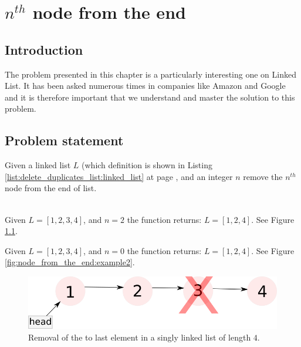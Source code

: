 %

\chapter{$n^{th}$ node from the end}
\label{ch:node_from_the_end}
\section*{Introduction}
The problem presented in this chapter is a particularly interesting one on Linked List. It has been asked numerous times in companies like Amazon and Google and it is therefore important that we understand and master the solution to this problem.

\section{Problem statement}
\begin{exercise}
Given a linked list $L$ (which definition is shown in Listing \ref{list:delete_duplicates_list:linked_list} at page \pageref{list:delete_duplicates_list:linked_list} , and an integer $n$ remove the $n^{th}$ node from the end of list.

\begin{example}
	\hfill \\
	Given $L=[1,2,3,4]$, and $n=2$ the function returns: $L=[1,2,4]$. See Figure \ref{fig:node_from_the_end:example1}.
\end{example}

\begin{example}
	Given $L=[1,2,3,4]$, and $n=0$ the function returns: $L=[1,2,4]$.
	See Figure \ref{fig:node_from_the_end:example2}.
\end{example}
\end{exercise}


\begin{figure}
	\label{fig:node_from_the_end:example1}
	\centering
	\includegraphics[scale=1.0]{sources/node_from_the_end/images/example1}
	\caption{Removal of the  to last element in a singly linked list of length $4$.}
\end{figure}

